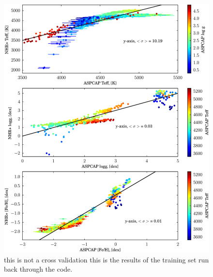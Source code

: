 \documentclass[12pt, preprint]{aastex}
\begin{document}
\begin{figure}[h!]
  \includegraphics[width=\hsize]{./plots/fits_all3_self.eps}
\caption{this is not a cross validation this is the results of the training set run back through the code. }
\label{fig:cal_teff}
\end{figure}
\end{document}
